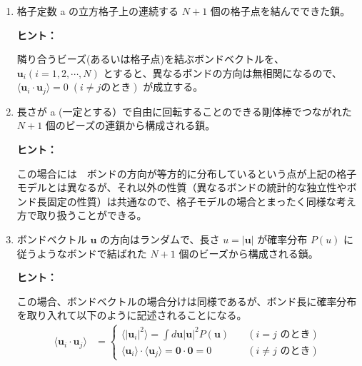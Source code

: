 \documentclass[uplatex,dvipdfmx,a4paper,11pt]{jsarticle}
\begin{document}
\begin{enumerate}
\setlength{\parskip}{0cm} %
\setlength{\itemsep}{0.5cm} %
\item
格子定数 a の立方格子上の連続する $N + 1$ 個の格子点を結んでできた鎖。
\begin{itembox}[l]{{\bf ヒント：}}

 隣り合うビーズ(あるいは格子点)を結ぶボンドベクトルを、$\bm{u}_i (i = 1, 2, \cdots, N)$ とすると、異なるボンドの方向は無相関になるので、
$\langle \bm{u}_i \cdot \bm{u}_j \rangle = 0 \; ( i \neq j \text{のとき})$ が成立する。
\end{itembox}

\item 
長さが a  (一定とする）で自由に回転することのできる剛体棒でつながれた $N+1$ 個のビーズの連鎖から構成される鎖。

\begin{itembox}[l]{{\bf ヒント：}}

この場合には　ボンドの方向が等方的に分布しているという点が上記の格子モデルとは異なるが、それ以外の性質（異なるボンドの統計的な独立性やボンド長固定の性質）は共通なので、格子モデルの場合とまったく同様な考え方で取り扱うことができる。

\end{itembox}


\item
ボンドベクトル $\bm{u}$ の方向はランダムで、長さ $u = |\bm{u}|$ が確率分布 $P(u)$ に従うようなボンドで結ばれた $N+1$ 個のビーズから構成される鎖。

\begin{itembox}[l]{{\bf ヒント：}}

この場合、ボンドベクトルの場合分けは同様であるが、ボンド長に確率分布を取り入れて以下のように記述されることになる。
\begin{align*}
\langle \bm{u}_i \cdot \bm{u}_j \rangle 
	&=
\begin{cases}
\langle |\bm{u}_i |^2 \rangle = \displaystyle \int d \bm{u}  \vert \bm{u} \vert^2 P(\bm{u}) 	&\quad (\text{$i = j$ のとき}) \\
\langle \bm{u}_i \rangle \cdot \langle \bm{u}_j \rangle = \bm{0}\cdot\bm{0} = 0	&\quad(\text{$i \neq j$ のとき})
\end{cases}
\end{align*}
\end{itembox}

\vspace{10pt}

\end{enumerate}
\end{document}

